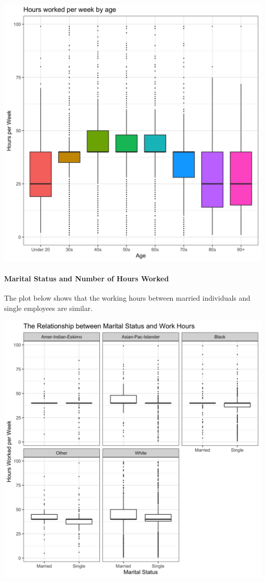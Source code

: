 \documentclass[]{article}
\let\oldparagraph\paragraph
\renewcommand{\paragraph}[1]{\oldparagraph{#1}\mbox{}}
\begin{document}
\includegraphics{../images/Plot_3_Hours_worked_per_week_by_age.png}

\hypertarget{marital-status-and-number-of-hours-worked}{%
\paragraph{Marital Status and Number of Hours
Worked}\label{marital-status-and-number-of-hours-worked}}

The plot below shows that the working hours between married individuals
and single employees are similar.

\includegraphics{../images/Plot_4_Marital_Status_and_Work_Hours.png}
\end{document}
